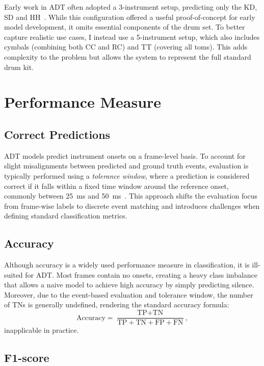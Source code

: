 Early work in \gls{ADT} often adopted a 3-instrument setup, predicting only the \acrfull{KD}, \acrfull{SD} and \acrfull{HH}~\cite{vogl2016recurrent}. While this configuration offered a useful proof-of-concept for early model development, it omits essential components of the drum set. To better capture realistic use cases, I instead use a 5-instrument setup, which also includes cymbals (combining both \acrfull{CC} and \acrfull{RC}) and \acrfull{TT} (covering all toms). This adds complexity to the problem but allows the system to represent the full standard drum kit.


\section{Performance Measure}

\subsection{Correct Predictions}

\gls{ADT} models predict instrument onsets on a frame-level basis. To account for slight misalignments between predicted and ground truth events, evaluation is typically performed using a \textit{tolerance window}, where a prediction is considered correct if it falls within a fixed time window around the reference onset, commonly between 25~ms and 50~ms~\cite{vogl2016recurrent}. This approach shifts the evaluation focus from frame-wise labels to discrete event matching and introduces challenges when defining standard classification metrics.

\subsection{Accuracy}

Although accuracy is a widely used performance measure in classification, it is ill-suited for \gls{ADT}. Most frames contain no onsets, creating a heavy class imbalance that allows a naive model to achieve high accuracy by simply predicting silence. Moreover, due to the event-based evaluation and tolerance window, the number of \glspl{TN} is generally undefined, rendering the standard accuracy formula:\[ \text{Accuracy} = \frac{\text{TP} + \text{TN}}{\text{TP} + \text{TN} + \text{FP} + \text{FN}},\] inapplicable in practice.

\subsection{F1-score}

